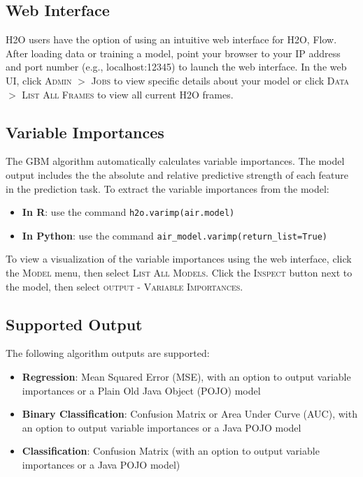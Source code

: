 \waterExampleInR

\newpage
\waterExampleInPython


\subsection{Web Interface}


H2O users have the option of using an intuitive web interface for H2O, Flow. After
loading data or training a model, point your browser to your IP address and port number (e.g., localhost:12345)
to launch the web interface. In the web UI, click \textsc{Admin} $>$ \textsc{Jobs} to view specific details
about your model or click \textsc{Data} $>$ \textsc{List All Frames} to view all current H2O frames.

\subsection{Variable Importances}

The GBM algorithm automatically calculates variable importances. The model output includes the
the absolute and relative predictive strength of each feature in the prediction task. To extract the variable importances from the model:
\begin{itemize}
\item \textbf{In R}: use the command \texttt{h2o.varimp(air.model)} 
\item \textbf{In Python}: use the command \texttt{air\_model.varimp(return\_list=True)}
\end{itemize}

To view a visualization of the variable importances using the web interface, click the \textsc{Model} menu, then select \textsc{List All Models}. Click the \textsc{Inspect} button next to the model, then select \textsc{output - Variable Importances}. 
\newpage
\subsection{Supported Output}
The following algorithm outputs are supported:
\begin{itemize}
\item {\bf{Regression}}: Mean Squared Error (MSE), with an option to output variable importances or a Plain Old Java Object (POJO) model
\item {\bf{Binary Classification}}: Confusion Matrix or Area Under Curve (AUC), with an option to output variable
importances or a Java POJO model
\item {\bf{Classification}}: Confusion Matrix (with an option to output variable importances or a Java POJO model)
\end{itemize}

